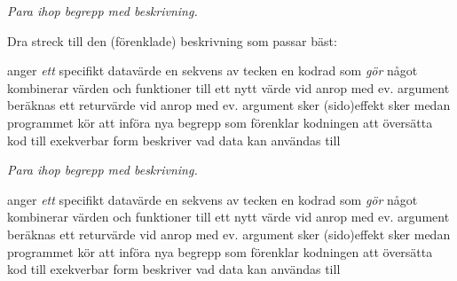 \QUESTEND





\def\what{\emph{Para ihop begrepp med beskrivning.}}

\QUESTBEGIN

\Task \what

\vspace{1em}\noindent Dra streck till den (förenklade) beskrivning som passar bäst: 

\begin{ConceptConnections}[0.15\textwidth]
       {anger \emph{ett} specifikt datavärde}
         {en sekvens av tecken}
           {en kodrad som \emph{gör} något}
        {kombinerar värden och funktioner till ett nytt värde}
       {vid anrop med ev. argument beräknas ett returvärde}
       {vid anrop med ev. argument sker (sido)effekt}
 {sker medan programmet kör}
     {att införa nya begrepp som förenklar kodningen}
      {att översätta kod till exekverbar form}
            {beskriver vad data kan användas till}
\end{ConceptConnections}

\SOLUTION

\TaskSolved \what

\begin{ConceptConnections}[0\textwidth]
       {anger \emph{ett} specifikt datavärde}
         {en sekvens av tecken}
           {en kodrad som \emph{gör} något}
        {kombinerar värden och funktioner till ett nytt värde}
       {vid anrop med ev. argument beräknas ett returvärde}
       {vid anrop med ev. argument sker (sido)effekt}
 {sker medan programmet kör}
     {att införa nya begrepp som förenklar kodningen}
      {att översätta kod till exekverbar form}
            {beskriver vad data kan användas till}
\end{ConceptConnections}

\QUESTEND







